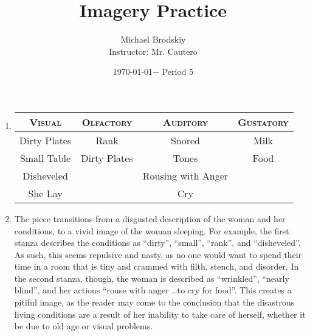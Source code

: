 \documentclass[12pt]{article}
\title{Imagery Practice}
\date{\today $-$ Period 5}
\author{Michael Brodskiy\\ \small Instructor: Mr. Cautero}
\begin{document}
\maketitle

\begin{enumerate}

  \item \begin{tabular}{|c|c|c|c|} \hline \textsc{Visual} & \textsc{Olfactory} & \textsc{Auditory} & \textsc{Gustatory}\\ \hline Dirty Plates & Rank & Snored & Milk\\ \hline Small Table & Dirty Plates & Tones & Food\\ \hline Disheveled & & Rousing with Anger & \\ \hline She Lay & & Cry & \\\hline  \end{tabular}

  \item The piece transitions from a disgusted description of the woman and her conditions, to a vivid image of the woman sleeping. For example, the first stanza describes the conditions as “dirty”, “small”, “rank”, and “disheveled”. As such, this seems repulsive and nasty, as no one would want to spend their time in a room that is tiny and crammed with filth, stench, and disorder. In the second stanza, though, the woman is described as “wrinkled”, “nearly blind”, and her actions “rouse with anger \dots to cry for food”. This creates a pitiful image, as the reader may come to the conclusion that the disastrous living conditions are a result of her inability to take care of herself, whether it be due to old age or visual problems.

\end{enumerate}
\end{document}
